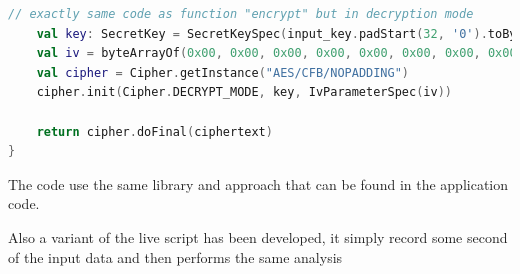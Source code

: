 \begin{enumerate}
\begin{lstlisting}[language=Kotlin]
    // exactly same code as function "encrypt" but in decryption mode
    val key: SecretKey = SecretKeySpec(input_key.padStart(32, '0').toByteArray(), "aes")
    val iv = byteArrayOf(0x00, 0x00, 0x00, 0x00, 0x00, 0x00, 0x00, 0x00, 0x00, 0x00, 0x00, 0x00, 0x00, 0x00, 0x00, 0x00)
    val cipher = Cipher.getInstance("AES/CFB/NOPADDING")
    cipher.init(Cipher.DECRYPT_MODE, key, IvParameterSpec(iv))

    return cipher.doFinal(ciphertext)
}
\end{lstlisting}
The code use the same library and approach that can be found in the application code.

\end{enumerate}


Also a variant of the live script has been developed, it simply record some second of the input data and then performs the same analysis



